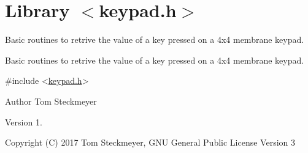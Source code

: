 \hypertarget{group__Keypad}{}\section{Library $<$keypad.\+h$>$}
\label{group__Keypad}


Basic routines to retrive the value of a key pressed on a 4x4 membrane keypad.  


Basic routines to retrive the value of a key pressed on a 4x4 membrane keypad. 


\begin{DoxyCode}
\textcolor{preprocessor}{#include <\hyperlink{keypad_8h}{keypad.h}>} 
\end{DoxyCode}


\begin{DoxyAuthor}{Author}
Tom Steckmeyer
\end{DoxyAuthor}
\begin{DoxyVersion}{Version}
1.
\end{DoxyVersion}
\begin{DoxyCopyright}{Copyright}
(C) 2017 Tom Steckmeyer, G\+NU General Public License Version 3 
\end{DoxyCopyright}
